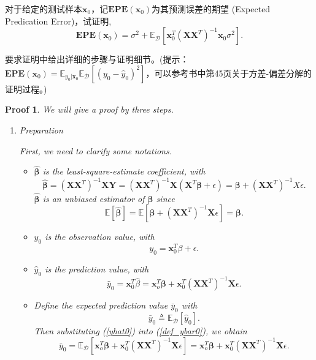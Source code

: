 \documentclass[a4paper,UTF8]{article}
\numberwithin{equation}{section}
\newtheorem*{myProof}{Proof}
\begin{document}
对于给定的测试样本$\textbf{x}_0$，记$\mathbf{EPE}(\textbf{x}_0)$为其预测误差的期望 (Expected Predication Error)，试证明,
\[
	\mathbf{EPE}(\textbf{x}_0) = \sigma^2+\mathbb{E}_{\mathcal{D}}[\textbf{x}_0^T(\textbf{X}\textbf{X}^T)^{-1}\textbf{x}_0\sigma^2].
\]

要求证明中给出详细的步骤与证明细节。(提示：$\mathbf{EPE}(\textbf{x}_0)=\mathbb{E}_{y_0|\textbf{x}_0} \mathbb{E}_{\mathcal{D}}[(y_0-\hat{y}_0)^2]$，可以参考书中第45页关于方差-偏差分解的证明过程。)

\begin{myProof}
We will give a proof by three steps.
\begin{enumerate}[Step 1.]
\item Preparation

First, we need to clarify some notations.
\begin{itemize}
\item
$\hat{\bm{\beta}}$ is the least-square-estimate coefficient, with
\begin{equation*}
\hat{\bm{\beta}} = (\textbf{X}\textbf{X}^T)^{-1}\textbf{X}\textbf{Y} = (\textbf{X}\textbf{X}^T)^{-1}\textbf{X}(\textbf{X}^T \bm{\beta} +\epsilon) = \bm{\beta} + (\textbf{X}\textbf{X}^T)^{-1}X\epsilon.
\end{equation*}
$\hat{\bm{\beta}}$ is an unbiased estimator of $\bm{\beta}$ since
\begin{equation*}
\mathbb{E} [\hat{\bm{\beta}}]=\mathbb{E} [ \bm{\beta} + (\textbf{X}\textbf{X}^T)^{-1}\textbf{X}\epsilon] = \bm{\beta}.
\end{equation*}
\item 
$y_0$ is the observation value, with
\begin{equation} \label{y0}
y_0 = \textbf{x}_0^T \beta +\epsilon.
\end{equation}
\item
$\hat{y}_0$ is the prediction value, with
\begin{equation} \label{yhat0}
\hat{y}_0 = \textbf{x}_0^T \hat{\beta} = \textbf{x}_o^T \bm{\beta} + \textbf{x}_0^T (\textbf{X}\textbf{X}^T)^{-1} \textbf{X} \epsilon .
\end{equation}

\item Define the expected prediction value $\bar{y}_0$ with 
\begin{equation} \label{def_ybar0}
\bar{y}_0 \triangleq \mathbb{E}_{\mathcal{D}} [\hat{y}_0].
\end{equation}
Then substituting (\ref{yhat0}) into (\ref{def_ybar0}), we obtain
\begin{equation} \label{ybar0}
\bar{y}_0 = \mathbb{E}_{\mathcal{D}}[ \textbf{x}_o^T \bm{\beta} + \textbf{x}_0^T (\textbf{X}\textbf{X}^T)^{-1} \textbf{X} \epsilon] =   \textbf{x}_o^T \bm{\beta} + \textbf{x}_0^T (\textbf{X}\textbf{X}^T)^{-1} \textbf{X} \epsilon.
\end{equation}


\end{itemize}
\end{enumerate}
\end{myProof}
\end{document}
